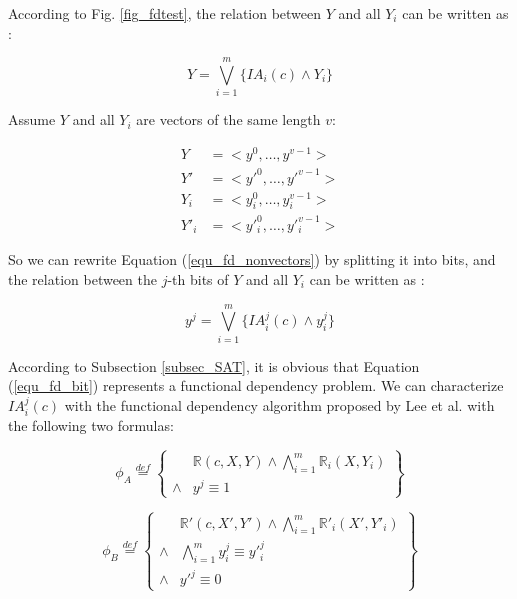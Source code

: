 \documentclass[journal]{IEEEtran}
\begin{document}
According to Fig. \ref{fig_fdtest},
the relation between $Y$ and all $Y_i$ can be written as :

\begin{equation}\label{equ_fd_nonvectors}
Y=\bigvee _{i=1}^{m} \{IA_i(c)\wedge Y_i\}
\end{equation}

Assume $Y$ and all $Y_i$ are vectors of the same length $v$:

\begin{equation}\label{equ_fd_vectors}
\begin{split}
Y&=<y^{0},\dots,y^{v-1}>\\
Y'&=<y'^{0},\dots,y'^{v-1}>\\
Y_i&=<y^{0}_i,\dots,y^{v-1}_i>\\
Y'_i&=<y'^{0}_i,\dots,y'^{v-1}_i>
\end{split}
\end{equation}

So we can rewrite Equation (\ref{equ_fd_nonvectors}) by splitting it into bits,
and the relation between the $j$-th bits of $Y$ and all $Y_i$ can be written as :

\begin{equation}\label{equ_fd_bit}
y^{j}=\bigvee _{i=1}^{m} \{IA^j_i(c)\wedge y^j_i\}
\end{equation}

According to Subsection \ref{subsec_SAT},
it is obvious that Equation (\ref{equ_fd_bit}) represents a functional dependency problem.
We can characterize $IA^j_i(c)$ with the functional dependency algorithm proposed by Lee et al. \cite{funcdep} with the following two formulas:

\begin{equation}\label{equ_fdtestbitA}
\phi_A \stackrel{def}{=}\left\{
\begin{array}{cc}
      & \mathbb{R}(c,X,Y)\wedge \bigwedge_{i=1}^{m}\mathbb{R}_i(X,Y_i)  \\
\wedge& y^j\equiv 1
\end{array}
\right\}
\end{equation}

\begin{equation}\label{equ_fdtestbitB}
\phi_B \stackrel{def}{=}\left\{
\begin{array}{cc}
& \mathbb{R}'(c,X',Y') \wedge \bigwedge_{i=1}^{m}\mathbb{R}'_i(X',Y'_i)  \\
\wedge&\bigwedge_{i=1}^{m}y^j_i\equiv y'^j_i\\
\wedge& y'^j\equiv 0
\end{array}
\right\}
\end{equation}
\end{document}

